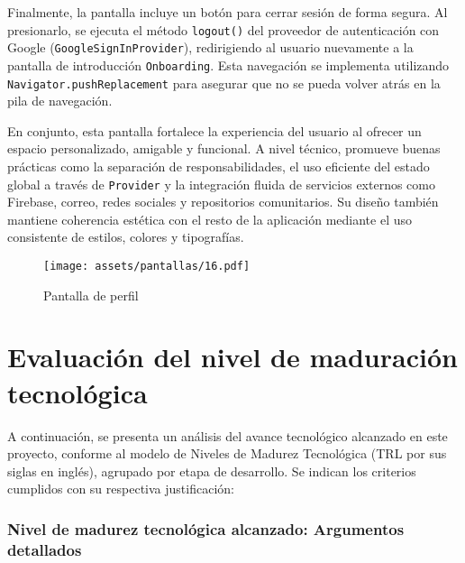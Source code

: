 Finalmente, la pantalla incluye un botón para cerrar sesión de forma segura. Al presionarlo, se ejecuta el método \texttt{logout()} del proveedor de autenticación con Google (\texttt{GoogleSignInProvider}), redirigiendo al usuario nuevamente a la pantalla de introducción \texttt{Onboarding}. Esta navegación se implementa utilizando \texttt{Navigator.pushReplacement} para asegurar que no se pueda volver atrás en la pila de navegación.

En conjunto, esta pantalla fortalece la experiencia del usuario al ofrecer un espacio personalizado, amigable y funcional. A nivel técnico, promueve buenas prácticas como la separación de responsabilidades, el uso eficiente del estado global a través de \texttt{Provider} y la integración fluida de servicios externos como Firebase, correo, redes sociales y repositorios comunitarios. Su diseño también mantiene coherencia estética con el resto de la aplicación mediante el uso consistente de estilos, colores y tipografías.



\begin{figure}[h!]
\centering
  \texttt{[image: assets/pantallas/16.pdf]}
  \caption{Pantalla de perfil}
  \label{pantallas16}
\end{figure}

 
\newpage
\section{Evaluación del nivel de maduración tecnológica}

A continuación, se presenta un análisis del avance tecnológico alcanzado en este proyecto, conforme al modelo de Niveles de Madurez Tecnológica (TRL por sus siglas en inglés), agrupado por etapa de desarrollo. Se indican los criterios cumplidos con su respectiva justificación:

\subsubsection*{Nivel de madurez tecnológica alcanzado: Argumentos detallados}

